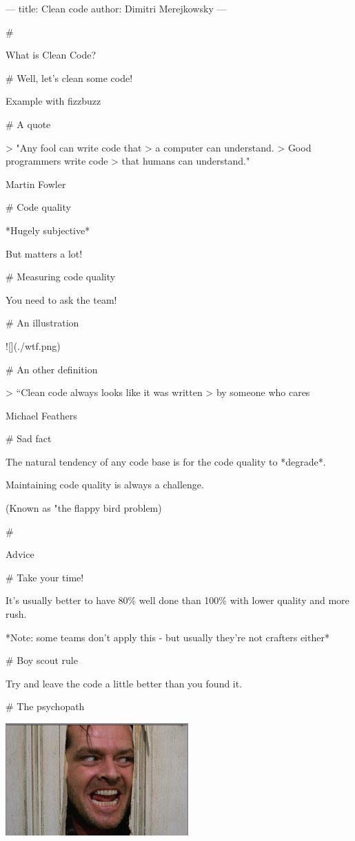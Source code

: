 ---
title: Clean code
author: Dimitri Merejkowsky
---

#

\huge \center What is Clean Code?

# Well, let's clean some code!

\large \center Example with fizzbuzz

# A quote

> "Any fool can write code that
> a computer can understand.
> Good programmers write code
> that humans can understand."

Martin Fowler

# Code quality

*Hugely subjective*

But matters a lot!

# Measuring code quality

You need to ask the team!

# An illustration

![](./wtf.png)

# An other definition

> “Clean code always looks like it was written
> by someone who cares

Michael Feathers

# Sad fact

The natural tendency of any code base is for the code quality to *degrade*.

Maintaining code quality is always a challenge.

(Known as "the flappy bird problem)

#

\huge \center Advice

# Take your time!

It's usually better to have 80\% well done than 100\% with lower quality
and more rush.

*Note: some teams don't apply this - but usually they're not crafters
either*

# Boy scout rule

Try and leave the code a little better than you found it.


# The psychopath

\includegraphics[width=7cm]{shining.png}

